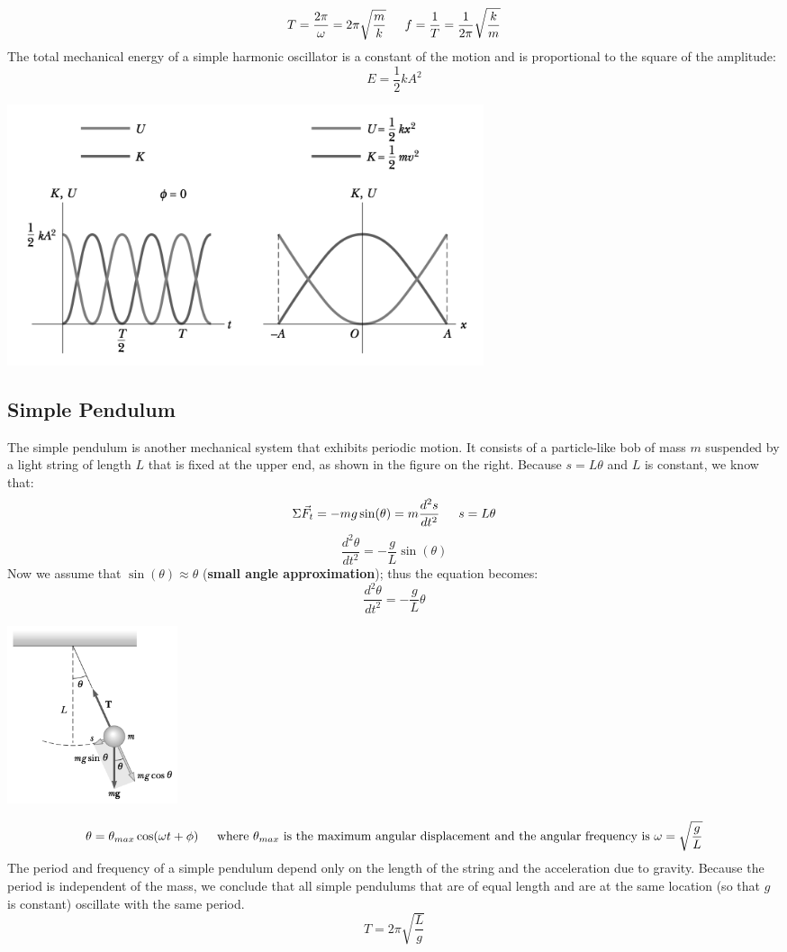 \documentclass{article}
\begin{document}
\[
T=\frac{2\pi}{\omega}=2\pi\sqrt{\frac{m}{k}} \indent
f=\frac{1}{T}=\frac{1}{2\pi}\sqrt{\frac{k}{m}}
\]
The total mechanical energy of a simple harmonic oscillator is a constant of the motion and is proportional to the square of the amplitude:
\[
E=\frac{1}{2}kA^2
\]
\centerline{\includegraphics[width=14cm]{energyGr.png}}

\subsection{Simple Pendulum}
\begin{multicols}{2}
  The simple pendulum is another mechanical system that exhibits periodic motion. It consists of a particle-like bob of mass $m$ suspended by a light string of length $L$ that is fixed at the upper end, as shown in the figure on the right. Because $s=L\theta$ and $L$ is constant, we know that:
  \[
  \Sigma\vec{F}_t=-mg\sin(\theta)=m\frac{d^2s}{dt^2} \indent
  s=L\theta
  \]
  \[
  \frac{d^2\theta}{dt^2}=-\frac{g}{L}\sin(\theta)
  \]
  Now we assume that $\sin(\theta)\approx\theta$ (\textbf{small angle approximation}); thus the equation becomes:
  \[
  \frac{d^2\theta}{dt^2}=-\frac{g}{L}\theta
  \]
  \columnbreak
  \centerline{\includegraphics[width=5cm]{simPen.png}}
\end{multicols}
\[
\theta=\theta_{max}\cos(\omega t+\phi) \indent
\text{where $\theta_{max}$ is the maximum angular displacement and the angular frequency is $\omega=\sqrt{\frac{g}{L}}$}
\]
The period and frequency of a simple pendulum depend only on the length of the string and the acceleration due to gravity. Because the period is independent of the mass, we conclude that all simple pendulums that are of equal length and are at the same location (so that $g$ is constant) oscillate with the same period.
\[
T=2\pi\sqrt{\frac{L}{g}}
\]
\end{document}
